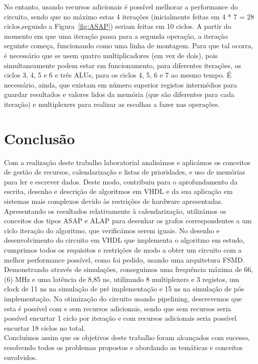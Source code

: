 \documentclass{article} %
\begin{document}
		\noindent No entanto, usando recursos adicionais é possível melhorar a performance do circuito, sendo que no máximo estas 4 iterações (inicialmente feitas em 4 * 7 = 28 ciclos,segundo a Figura~\ref{fig:ASAP}) seriam feitas em 10 ciclos. A partir do momento em que uma iteração passa para a segunda operação, a iteração seguinte começa, funcionando como uma linha de montagem. Para que tal ocorra, é necessário que se usem quatro multiplicadores (em vez de dois), pois simultaneamente podem estar em funcionamento, para diferentes iterações, os ciclos 3, 4, 5 e 6 e três ALUs, para os ciclos 4, 5, 6 e 7 ao mesmo tempo. É necessário, ainda, que existam em número superior registos intermédios para guardar resultados e valores lidos da memória (que são diferentes para cada iteração) e multiplexers para realizar as escolhas a fazer nas operações.

	\section{Conclusão}

		Com a realização deste trabalho laboratorial analisámos e aplicámos os conceitos de gestão de recursos, calendarização e listas de prioridades, e uso de memórias para ler e escrever dados. Deste modo, contribuiu para o aprofundamento da escrita, desenho e descrição de algoritmos em VHDL e da sua aplicação em sistemas mais complexos devido às restrições de hardware apresentadas.\\

		\noindent Apresentando os resultados relativamente à calendarização, utilizámos os conceitos dos tipos ASAP e ALAP para desenhar os grafos correspondentes a um ciclo iteração do algoritmo, que verificámos serem iguais. No desenho e desenvolvimento do circuito em VHDL que implementa o algoritmo em estudo, cumprimos todos os requisitos e restrições de modo a obter um circuito com a melhor performance possível, como foi pedido, usando uma arquitetura FSMD. Demonstrando através de simulações, conseguimos uma frequência máxima de 66,(6) MHz e uma latência de 8,85 ns, utilizando  8 multiplexers e 3 registos, um clock de 11 ns na simulação de pré implementação e 15 ns na simulação de pós implementação. Na otimização do circuito usando pipelining, descrevemos que esta é possível com e sem recursos adicionais, sendo que sem recursos seria possível encurtar 1 ciclo por iteração e com recursos adicionais seria possível encurtar 18 ciclos no total.\\

		\noindent Concluímos assim que os objetivos deste trabalho foram alcançados com sucesso, resolvendo todos os problemas propostos e abordando as temáticas e conceitos envolvidos.
	
\end{document}
